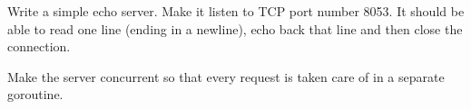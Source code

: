 \begin{Exercise}[title={Echo server},difficulty=8]
\label{ex:echo}
\Question\label{ex:echo q1}
Write a simple echo server. Make it listen to TCP port number 8053. It should
be able to read one line (ending in a newline), echo back that line
and then close the connection.

\Question\label{ex:echo q2}
Make the server concurrent so that every request is taken care of in a separate
goroutine.

\end{Exercise}

\begin{Answer}
\Question
\end{Answer}

